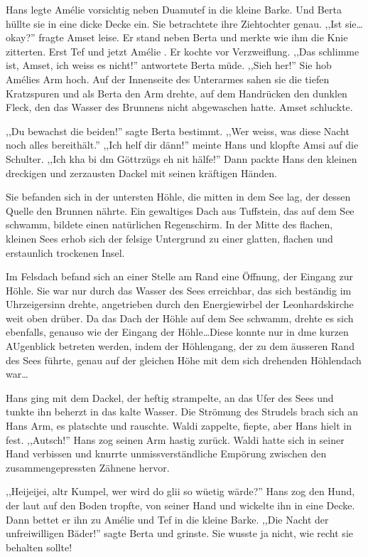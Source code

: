 \documentclass[11pt,titlepage,a5paper]{book}
\newcommand{\am}{Amélie }
\begin{document}
Hans legte \am vorsichtig neben Duamutef in die kleine Barke. Und Berta hüllte sie in eine dicke Decke ein. Sie betrachtete ihre Ziehtochter genau. ,,Ist sie\dots okay?'' fragte Amset leise. Er stand neben Berta und merkte wie ihm die Knie zitterten. Erst Tef und jetzt \am . Er kochte vor Verzweiflung. ,,Das schlimme ist, Amset, ich weiss es nicht!'' antwortete Berta müde. ,,Sieh her!'' Sie hob Amélies Arm hoch. Auf der Innenseite des Unterarmes sahen sie die tiefen Kratzspuren und als Berta den Arm drehte, auf dem Handrücken den dunklen Fleck, den das Wasser des Brunnens nicht abgewaschen hatte. Amset schluckte.

,,Du bewachst die beiden!'' sagte Berta bestimmt. ,,Wer weiss, was diese Nacht noch alles bereithält.'' ,,Ich helf dir dänn!'' meinte Hans und klopfte Amsi auf die Schulter. ,,Ich kha bi dm Göttrzügs eh nit hälfe!'' Dann packte Hans den kleinen dreckigen und zerzausten Dackel mit seinen kräftigen Händen. 

Sie befanden sich in der untersten Höhle, die mitten in dem See lag, der dessen Quelle den Brunnen nährte. Ein gewaltiges Dach aus Tuffstein, das auf dem See schwamm, bildete einen natürlichen Regenschirm. In der Mitte des flachen, kleinen Sees erhob sich der felsige Untergrund zu einer glatten, flachen und erstaunlich trockenen Insel.

Im Felsdach befand sich an einer Stelle am Rand eine Öffnung, der Eingang zur Höhle. Sie war nur durch das Wasser des Sees erreichbar, das sich beständig im Uhrzeigersinn drehte, angetrieben durch den Energiewirbel der Leonhardskirche weit oben drüber. Da das Dach der Höhle auf dem See schwamm, drehte es sich ebenfalls, genauso wie der Eingang der Höhle\dots Diese konnte nur in dme kurzen AUgenblick betreten werden, indem der Höhlengang, der zu dem äusseren Rand des Sees führte, genau auf der gleichen Höhe mit dem sich drehenden Höhlendach war\dots

Hans ging mit dem Dackel, der heftig strampelte, an das Ufer des Sees und tunkte ihn beherzt in das kalte Wasser. Die Strömung des Strudels brach sich an Hans Arm, es platschte und rauschte. Waldi zappelte,  fiepte, aber Hans hielt in fest. ,,Autsch!'' Hans zog seinen Arm hastig zurück. Waldi hatte sich in seiner Hand verbissen und knurrte unmissverständliche Empörung zwischen den zusammengepressten Zähnene hervor.

 ,,Heijeijei, altr Kumpel, wer wird do glii so wüetig wärde?'' Hans zog den Hund, der laut auf den Boden tropfte, von seiner Hand und wickelte ihn in eine Decke. Dann bettet er ihn zu \am und Tef in die kleine Barke. ,,Die Nacht der unfreiwilligen  Bäder!'' sagte Berta und grinste. Sie wusste ja nicht, wie recht sie behalten sollte!
\end{document}
